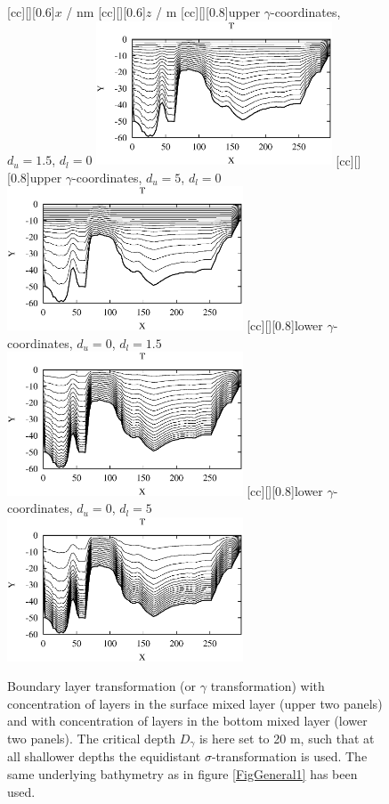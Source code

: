 \begin{figure}
\begin{center}
[cc][][0.6]{$x$ / nm}
[cc][][0.6]{$z$ / m}
[cc][][0.8]{upper $\gamma$-coordinates, $d_u=1.5$, $d_l=0$}
\includegraphics[width=7cm,bbllx=50,bblly=50,bburx=529,bbury=346]{./figures/gammaup1.ps}
[cc][][0.8]{upper $\gamma$-coordinates, $d_u=5$, $d_l=0$}
\includegraphics[width=7cm,bbllx=50,bblly=50,bburx=529,bbury=346]{./figures/gammaup5.ps}
[cc][][0.8]{lower $\gamma$-coordinates, $d_u=0$, $d_l=1.5$}
\includegraphics[width=7cm,bbllx=50,bblly=50,bburx=529,bbury=346]{./figures/gammalow1.ps}
[cc][][0.8]{lower $\gamma$-coordinates, $d_u=0$, $d_l=5$}
\includegraphics[width=7cm,bbllx=50,bblly=50,bburx=529,bbury=346]{./figures/gammalow5.ps}
\caption{
Boundary layer transformation (or $\gamma$ transformation)
with concentration of layers in the surface mixed layer (upper two
panels) and with concentration of layers in the bottom mixed layer (lower two
panels). The critical depth $D_{\gamma}$ is here set to 20 m,
such that at all shallower depths the equidistant $\sigma$-transformation
is used. The same underlying bathymetry as in figure \ref{FigGeneral1} 
has been used. 
}\label{FigGeneral2}
\end{center}
\end{figure}

